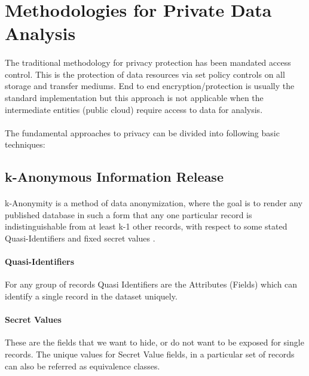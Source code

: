 \documentclass[12pt]{report}
\theoremstyle{named}
\begin{document}
\section{Methodologies for Private Data Analysis}
\paragraph{}
The traditional methodology for privacy protection has been mandated access control. This is the protection of data resources via set policy controls on all storage and transfer mediums. End to end encryption/protection is usually the standard implementation but this approach is not applicable when the intermediate entities (public cloud) require access to data for analysis.
\paragraph{}
The fundamental approaches to privacy can be divided into following basic techniques:


\subsection{k-Anonymous Information Release}
\paragraph{}
k-Anonymity \cite{sweeney2002k} is a method of data anonymization, where the goal is to render any published database in such a form that any one particular record is indistinguishable from at least k-1 other records, with respect to some stated Quasi-Identifiers and fixed secret values \cite{dalenius1986finding}.

\paragraph{Quasi-Identifiers}
For any group of records Quasi Identifiers are the Attributes (Fields) which can identify a single record in the dataset uniquely.
\paragraph{Secret Values}
These are the fields that we want to hide, or do not want to be exposed for single records. The unique values for Secret Value fields, in a particular set of records can also be referred as equivalence classes.
\end{document}
